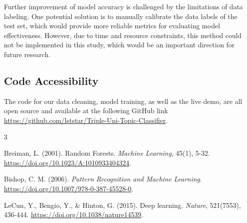 \documentclass[a4paper, twocolumn]{article}
\begin{document}
Further improvement of model accuracy is challenged by the limitations of data labeling. One potential solution is to manually calibrate the data labels of the test set, which would provide more reliable metrics for evaluating model effectiveness. However, due to time and resource constraints, this method could not be implemented in this study, which would be an important direction for future research.

\subsection{Code Accessibility}

The code for our data cleaning, model training, as well as the live demo, are all open source and available at the following GitHub link \href{https://github.com/lststar/Triple-Uni-Topic-Classifier}{https://github.com/lststar/Triple-Uni-Topic-Classifier}.

\newpage

\begin{thebibliography}{3}

Breiman, L. (2001). Random Forests. 
\textit{Machine Learning}, 45(1), 5-32.
\url{https://doi.org/10.1023/A:1010933404324}.

Bishop, C. M. (2006).
\textit{Pattern Recognition and Machine Learning}.
\url{https://doi.org/10.1007/978-0-387-45528-0}.

LeCun, Y., Bengio, Y., \& Hinton, G. (2015). Deep learning.
\textit{Nature}, 521(7553), 436-444.
\url{https://doi.org/10.1038/nature14539}.

\end{thebibliography}
\end{document}
